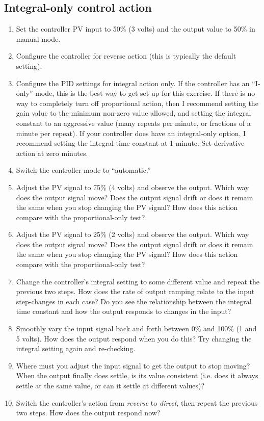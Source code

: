 \filbreak
\subsection{Integral-only control action}

\begin{enumerate}
\item Set the controller PV input to 50\% (3 volts) and the output value to 50\% in manual mode.
\item Configure the controller for reverse action (this is typically the default setting).
\item Configure the PID settings for integral action only.  If the controller has an ``I-only'' mode, this is the best way to get set up for this exercise.  If there is no way to completely turn off proportional action, then I recommend setting the gain value to the minimum non-zero value allowed, and setting the integral constant to an aggressive value (many repeats per minute, or fractions of a minute per repeat).  If your controller does have an integral-only option, I recommend setting the integral time constant at 1 minute.  Set derivative action at zero minutes.
\item Switch the controller mode to ``automatic.''
\item Adjust the PV signal to 75\% (4 volts) and observe the output.  Which way does the output signal move?  Does the output signal drift or does it remain the same when you stop changing the PV signal?  How does this action compare with the proportional-only test?
\item Adjust the PV signal to 25\% (2 volts) and observe the output.  Which way does the output signal move?  Does the output signal drift or does it remain the same when you stop changing the PV signal?  How does this action compare with the proportional-only test?
\item Change the controller's integral setting to some different value and repeat the previous two steps.  How does the rate of output ramping relate to the input step-changes in each case?  Do you see the relationship between the integral time constant and how the output responds to changes in the input?
\item Smoothly vary the input signal back and forth between 0\% and 100\% (1 and 5 volts).  How does the output respond when you do this?  Try changing the integral setting again and re-checking.
\item Where must you adjust the input signal to get the output to stop moving?  When the output finally does settle, is its value consistent (i.e. does it always settle at the same value, or can it settle at different values)?
\item Switch the controller's action from \textit{reverse} to \textit{direct}, then repeat the previous two steps.  How does the output respond now?
\end{enumerate}








